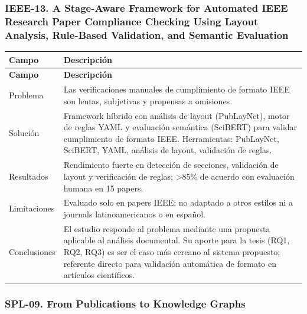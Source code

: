 \subsubsection*{IEEE-13. A Stage-Aware Framework for Automated IEEE Research Paper Compliance Checking Using Layout Analysis, Rule-Based Validation, and Semantic Evaluation}

\begin{longtable}{@{}>{\raggedright\arraybackslash}p{}>{\raggedright\arraybackslash}p{}@{}}
\toprule
\textbf{Campo} & \textbf{Descripción} \\
\midrule
\endfirsthead
\toprule
\textbf{Campo} & \textbf{Descripción} \\
\midrule
\endhead
\bottomrule
\endfoot
\endlastfoot
Problema & Las verificaciones manuales de cumplimiento de formato IEEE son lentas, subjetivas y propensas a omisiones. \\
Solución & Framework híbrido con análisis de layout (PubLayNet), motor de reglas YAML y evaluación semántica (SciBERT) para validar cumplimiento de formato IEEE. Herramientas: PubLayNet, SciBERT, YAML, análisis de layout, validación de reglas. \\
Resultados & Rendimiento fuerte en detección de secciones, validación de layout y verificación de reglas; >85\% de acuerdo con evaluación humana en 15 papers. \\
Limitaciones & Evaluado solo en papers IEEE; no adaptado a otros estilos ni a journals latinoamericanos o en español. \\
Conclusiones & El estudio responde al problema mediante una propuesta aplicable al análisis documental. Su aporte para la tesis (RQ1, RQ2, RQ3) es ser el caso más cercano al sistema propuesto; referente directo para validación automática de formato en artículos científicos. \\
\end{longtable}

\subsubsection*{SPL-09. From Publications to Knowledge Graphs}

